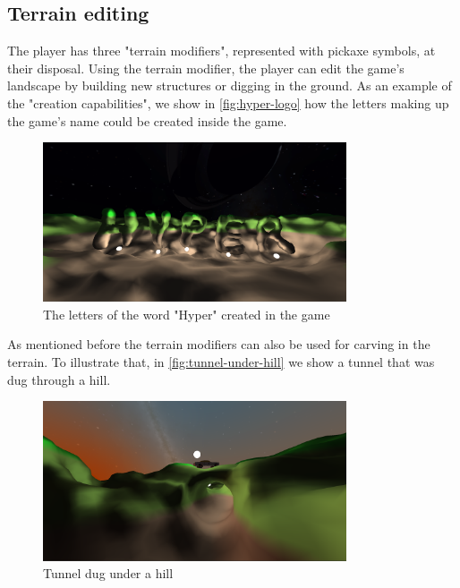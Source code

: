 \subsection{Terrain editing}
The player has three "terrain modifiers", represented with pickaxe symbols, at their disposal.
Using the terrain modifier, the player can edit the game's landscape by building new structures or digging in the ground.
As an example of the "creation capabilities", we show in \autoref{fig:hyper-logo} how the letters making up the game's name could be created inside the game.
\begin{figure}[h]
    \centering
    \includegraphics[width=0.8\textwidth]{chapters/results/sections/gameplay/resources/hyper-logo-night-2.png}
    \caption{The letters of the word "Hyper" created in the game}
    \label{fig:hyper-logo}
\end{figure}

As mentioned before the terrain modifiers can also be used for carving in the terrain.
To illustrate that, in \autoref{fig:tunnel-under-hill} we show a tunnel that was dug through a hill.
\begin{figure}[h]
    \centering
    \includegraphics[width=0.8\textwidth]{chapters/results/sections/gameplay/resources/tunnel-with-car.png}
    \caption{Tunnel dug under a hill}
    \label{fig:tunnel-under-hill}
\end{figure}
